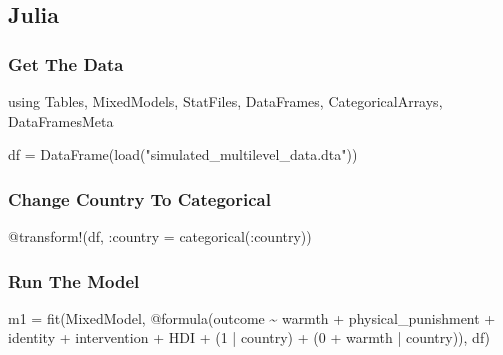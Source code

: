 \documentclass[
  letterpaper,
  DIV=11,
  numbers=noendperiod]{scrreprt}
\newenvironment{Shaded}{\begin{snugshade}}{\end{snugshade}}
\newcommand{\BuiltInTok}[1]{\textcolor[rgb]{0.00,0.23,0.31}{#1}}
\newcommand{\FloatTok}[1]{\textcolor[rgb]{0.68,0.00,0.00}{#1}}
\newcommand{\FunctionTok}[1]{\textcolor[rgb]{0.28,0.35,0.67}{#1}}
\newcommand{\ImportTok}[1]{\textcolor[rgb]{0.00,0.46,0.62}{#1}}
\newcommand{\NormalTok}[1]{\textcolor[rgb]{0.00,0.23,0.31}{#1}}
\newcommand{\OperatorTok}[1]{\textcolor[rgb]{0.37,0.37,0.37}{#1}}
\newcommand{\PreprocessorTok}[1]{\textcolor[rgb]{0.68,0.00,0.00}{#1}}
\newcommand{\StringTok}[1]{\textcolor[rgb]{0.13,0.47,0.30}{#1}}
\begin{document}
\subsection{Julia}

\subsubsection{Get The Data}\label{get-the-data-2}

\begin{Shaded}
\begin{Highlighting}[]
\ImportTok{using} \BuiltInTok{Tables}\NormalTok{, }\BuiltInTok{MixedModels}\NormalTok{, }\BuiltInTok{StatFiles}\NormalTok{, }\BuiltInTok{DataFrames}\NormalTok{, }\BuiltInTok{CategoricalArrays}\NormalTok{, }\BuiltInTok{DataFramesMeta}

\NormalTok{df }\OperatorTok{=} \FunctionTok{DataFrame}\NormalTok{(}\FunctionTok{load}\NormalTok{(}\StringTok{"simulated\_multilevel\_data.dta"}\NormalTok{))}
\end{Highlighting}
\end{Shaded}

\subsubsection{Change Country To
Categorical}\label{change-country-to-categorical}

\begin{Shaded}
\begin{Highlighting}[]
\PreprocessorTok{@transform}\NormalTok{!(df, }\OperatorTok{:}\NormalTok{country }\OperatorTok{=} \FunctionTok{categorical}\NormalTok{(}\OperatorTok{:}\NormalTok{country))}
\end{Highlighting}
\end{Shaded}

\subsubsection{Run The Model}\label{run-the-model-2}

\begin{Shaded}
\begin{Highlighting}[]

\NormalTok{m1 }\OperatorTok{=} \FunctionTok{fit}\NormalTok{(MixedModel, }\PreprocessorTok{@formula}\NormalTok{(outcome }\OperatorTok{\textasciitilde{}}\NormalTok{ warmth }\OperatorTok{+}\NormalTok{ physical\_punishment }\OperatorTok{+} 
\NormalTok{               identity }\OperatorTok{+}\NormalTok{ intervention }\OperatorTok{+}\NormalTok{ HDI }\OperatorTok{+}
\NormalTok{               (}\FloatTok{1} \OperatorTok{|}\NormalTok{ country) }\OperatorTok{+}
\NormalTok{               (}\FloatTok{0} \OperatorTok{+}\NormalTok{ warmth }\OperatorTok{|}\NormalTok{ country)), df)}
\end{Highlighting}
\end{Shaded}
\end{document}
